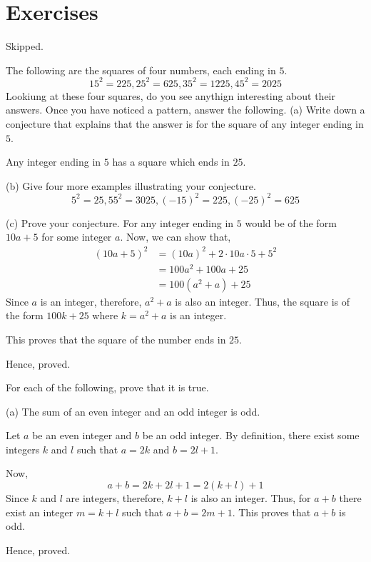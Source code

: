 \section*{Exercises}

\bp Skipped.\ep 

\bp 
	The following are the squares of four numbers, each ending in $5$.
	$$15^2 = 225, 25^2 = 625, 35^2 = 1225, 45^2 = 2025$$
	Lookiung at these four squares, do you see anythign interesting about their answers. Once you have noticed a pattern, answer the following.
	\bigbreak
	(a) Write down a conjecture that explains that the answer is for the square of any integer ending in $5$.

	\bs
		\begin{named}[Conjecture]
			Any integer ending in $5$ has a square which ends in $25$.
		\end{named}
	\es

	(b) Give four more examples illustrating your conjecture.
	\bs
		$$5^2 = 25, 55^2 = 3025, (-15)^2 = 225, (-25)^2 = 625$$
	\es

	(c) Prove your conjecture.
	\bs
		For any integer ending in $5$ would be of the form $10a+5$ for some integer $a$. Now, we can show that,
		\begin{align}
			(10a+5)^2 &= (10a)^2 + 2 \cdot 10a \cdot 5 + 5^2 \\
				&= 100a^2 + 100a + 25 \\
				&= 100(a^2+a) + 25
		\end{align}
		Since $a$ is an integer, therefore, $a^2 + a$ is also an integer.
		Thus, the square is of the form $100k+25$ where $k = a^2+a$ is an integer.

		This proves that the square of the number ends in $25$.

		Hence, proved.
	\es
\ep 

\bp 
	For each of the following, prove that it is true.

	\bigbreak
	(a) The sum of an even integer and an odd integer is odd.

	\bs
		Let $a$ be an even integer and $b$ be an odd integer. By definition, there exist some integers $k$ and $l$ such that $a = 2k$ and $b = 2l+1$.

		Now, 
		$$a + b = 2k + 2l + 1 = 2(k+l) + 1$$
		Since $k$ and $l$ are integers, therefore, $k+l$ is also an integer. Thus, for $a+b$ there exist an integer $m=k+l$ such that $a+b = 2m+1$.
		This proves that $a+b$ is odd.

		Hence, proved.
	\es

